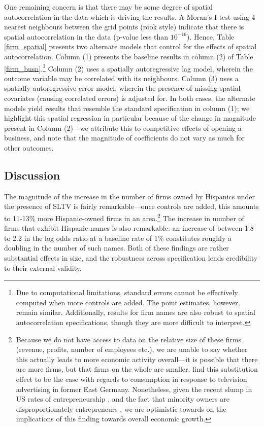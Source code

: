 \documentclass[11pt]{article}
\begin{document}
One remaining concern is that there may be some degree of spatial autocorrelation in the data which is driving the results. A Moran's I test using 4 nearest neighbours between the grid points (rook style) indicate that there is spatial autocorrelation in the data (p-value less than $10^{-16}$). Hence, Table \ref{firm_spatial} presents two alternate models that control for the effects of spatial autocorrelation. Column (1) presents the baseline results in column (2) of Table \ref{firm_busn}.\footnote{ Due to computational limitations, standard errors cannot be effectively computed when more controls are added. The point estimates, however, remain similar. Additionally, results for firm names are also robust to spatial autocorrelation specifications, though they are more difficult to interpret.} Column (2) uses a spatially autoregressive lag model, wherein the outcome variable may be correlated with its neighbours. Column (3) uses a spatially autoregressive error model, wherein the presence of missing spatial covariates (causing correlated errors) is adjusted for. In both cases, the alternate models yield results that resemble the standard specification in column (1); we highlight this spatial regression in particular because of the change in magnitude present in Column (2)---we attribute this to competitive effects of opening a business, and note that the magnitude of coefficients do not vary as much for other outcomes. 

\subsection{Discussion}
The magnitude of the increase in the number of firms owned by Hispanics under the presence of SLTV is fairly remarkable---once controls are added, this amounts to 11-13\% more Hispanic-owned firms in an area.\footnote{ Because we do not have access to data on the relative size of these firms (revenue, profits, number of employees etc.), we are unable to say whether this actually leads to more economic activity overall---it is possible that there are more firms, but that firms on the whole are smaller. \cite{bursztyn_tear_2016} find this substitution effect to be the case with regards to consumption in response to television advertising in former East Germany. Nonetheless, given the recent slump in US rates of entrepreneurship \citep{decker_role_2014}, and the fact that minority owners are disproportionately entrepreneurs \citep{feldman_minority_1991}, we are optimistic towards on the implications of this finding towards overall economic growth.} The increase in number of firms that exhibit Hispanic names is also remarkable: an increase of between 1.8 to 2.2 in the log odds ratio at a baseline rate of 1\% constitutes roughly a doubling in the number of such names. Both of these findings are rather substantial effects in size, and the robustness across specification lends credibility to their external validity.
\end{document}
